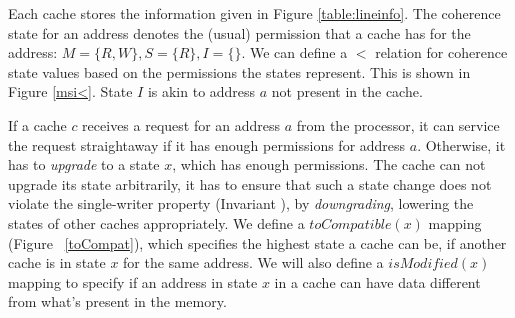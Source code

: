 Each cache stores the information given in Figure \ref{table:lineinfo}. The
coherence state for an address denotes the (usual) permission that a cache has
for the address: $M = \{R, W\}, S = \{R\}, I = \{\}$. We can define a $<$
relation for coherence state values based on the permissions the states
represent. This is shown in Figure \ref{msi<}. State $I$ is akin to address $a$
not present in the cache.

If a cache $c$ receives a request for an address $a$ from the processor, it can
service the request straightaway if it has enough permissions for address $a$.
Otherwise, it has to \emph{upgrade} to a state $x$, which has enough
permissions. The cache can not upgrade its state arbitrarily, it has to ensure
that such a state change does not violate the single-writer property (Invariant
\label{singleWriter}), by \emph{downgrading}, \ie lowering the states of other
caches appropriately. We define a $toCompatible(x)$ mapping (Figure
~\ref{toCompat}), which specifies the highest state a cache can be, if another
cache is in state $x$ for the same address. We will also define a
$isModified(x)$ mapping to specify if an address in state $x$ in a cache can
have data different from what's present in the memory.


